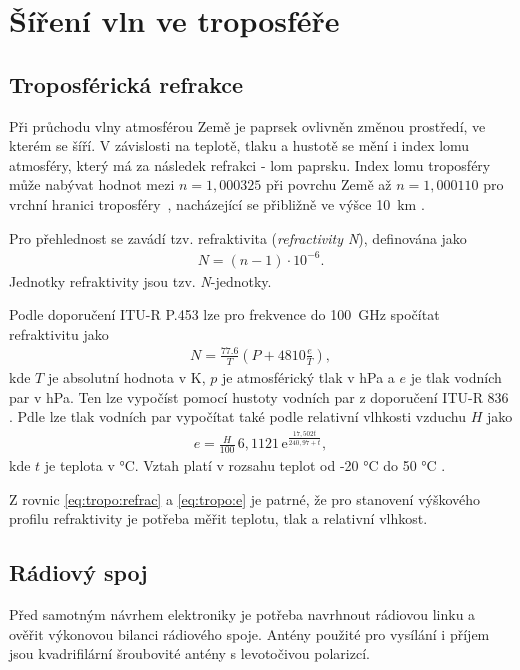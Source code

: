 \documentclass[twoside]{ctuthesis}
\newcommand{\mt}[1]{\text{#1}}
\theoremstyle{plain}
\theoremstyle{definition}
\theoremstyle{note}
\begin{document}
	\section{Šíření vln ve troposféře}
		\subsection{Troposférická refrakce}
		Při průchodu vlny atmosférou Země je paprsek ovlivněn změnou prostředí, ve kterém se šíří. V závislosti na teplotě, tlaku a hustotě se mění i index lomu atmosféry, který má za následek refrakci - lom paprsku. Index lomu troposféry může nabývat hodnot mezi $n=1{,}000325$ při povrchu Země až $n=1{,}000110$ pro vrchní hranici troposféry~\cite{zaklady:sireni:vln}, nacházející se přibližně ve výšce 10~km \cite{web_tropo}.

		Pro přehlednost se zavádí tzv. refraktivita (\textit{refractivity N}), definována jako
		\begin{align}
			N = (n-1)\cdot 10^{-6}.
		\end{align}
		Jednotky refraktivity jsou tzv. \textit{N}-jednotky.

		Podle doporučení ITU-R P.453 \cite{ITU:refrac} lze pro frekvence do 100~GHz spočítat refraktivitu jako
		\begin{align}
			N = \frac{77.6}{T} \left(P + 4810\frac{e}{T}\right),
			\label{eq:tropo:refrac}
		\end{align}
		kde $T$ je absolutní hodnota v K, $p$ je atmosférický tlak v hPa a $e$ je tlak vodních par v hPa. Ten lze vypočíst pomocí hustoty vodních par z doporučení ITU-R 836 \cite{ITU:vapour}. Pdle \cite{ITU:refrac} lze tlak vodních par vypočítat také podle relativní vlhkosti vzduchu $H$ jako
		\begin{align}
			e = \frac{H}{100}\,6{,}1121\,\mt{e}^{\frac{17{,}502t}{240{,}97 + t}},
			\label{eq:tropo:e}
		\end{align}
		kde $t$ je teplota v °C. Vztah platí v rozsahu teplot od -20 °C do 50 °C \cite{zaklady:sireni:vln}.

		Z rovnic \eqref{eq:tropo:refrac} a \eqref{eq:tropo:e} je patrné, že pro stanovení výškového profilu refraktivity je potřeba měřit teplotu, tlak a relativní vlhkost. 



		\subsection{Rádiový spoj}
		Před samotným návrhem elektroniky je potřeba navrhnout rádiovou linku a ověřit výkonovou bilanci rádiového spoje. Antény použité pro vysílání i příjem jsou kvadrifilární šroubovité antény s levotočivou polarizcí. 
\end{document}
